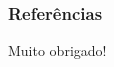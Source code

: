 
\begin{frame}[allowframebreaks]
  \frametitle{Referências}
  \nocite{*}
  \printbibliography
\end{frame}

\begin{frame}
  \vfill
  \begin{center}
    \LARGE Muito obrigado!
  \end{center}
  \vfill
\end{frame}
